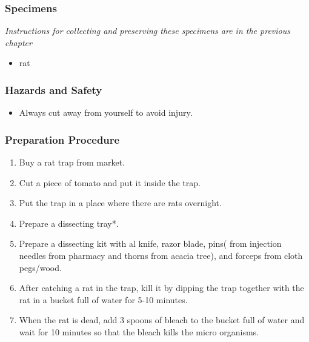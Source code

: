 \subsubsection*{Specimens}
\textit{Instructions for collecting and preserving these specimens are in the previous chapter}
\begin{itemize}
\item{rat}
\end{itemize}

\subsubsection*{Hazards and Safety}
\begin{itemize}
\item{Always cut away from yourself to avoid injury.}
\end{itemize}

\subsubsection*{Preparation Procedure}
\begin{enumerate}
\item{Buy a rat trap from market.}
\item{Cut a piece of tomato and put it inside the trap.}
\item{Put the trap in a place where there are rats overnight.}
\item{Prepare a dissecting tray*.}
\item{Prepare a dissecting kit with al knife, razor blade, pins( from injection needles from pharmacy and thorns from acacia tree), and forceps from cloth pegs/wood.}
\item{After catching a rat in the trap, kill it by dipping the trap together with the rat in a bucket full of water for 5-10 minutes.}
\item{When the rat is dead, add 3 spoons of bleach to the bucket full of water and wait for 10 minutes so that the bleach kills the micro organisms.}
\end{enumerate}

